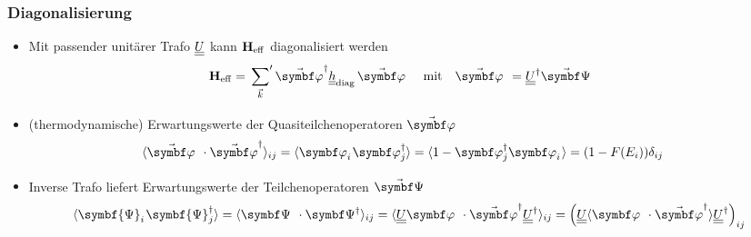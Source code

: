 \begin{frame}
    \frametitle{Diagonalisierung }
    \begin{itemize}
        \item Mit passender unitärer Trafo $\underline{\underline{U}}$ kann $\mathbf{H}_{\mathrm{eff}}$ diagonalisiert werden 
        \begin{align*}
            \oHeff &= \sump{\vk} \vophid \dul{h}_\text{diag} \, \vophi & \text{mit} & & \vophi &= \dul{U}^\dagg \vopsi
        \end{align*}
        \item (thermodynamische) Erwartungswerte der Quasiteilchenoperatoren $\vophi$
        \begin{align*}
            \expval{\vophi \cdot \vophid}_{ij} = \expval{\ophi_{i} \ophid_{j}} &= \expval{1 -\ophid_{j}  \ophi_{i}} = (1 - F(E_i))\delta_{ij}
        \end{align*}
        \item Inverse Trafo liefert Erwartungswerte der Teilchenoperatoren $\vopsi$
        \begin{align*}
            \expval{\symbf{\Psi}^{\pdagg}_i \symbf{\Psi}^{\dagg}_j} = \expval{\opsi \cdot \opsid}_{ij} = \expval{\dul{U} \ophi \cdot \vophid \dul{U}^\dagger}_{ij} = \left(\dul{U} \expval{\ophi \cdot \vophid} \dul{U}^\dagg\right)_{ij}
        \end{align*}
    \end{itemize}
\end{frame}

